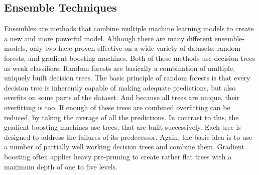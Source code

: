 \subsection{Ensemble Techniques}
Ensembles are methods that combine multiple machine learning models to create a new and more powerful model. Although there are many different ensemble-models, only two have proven effective on a wide variety of datasets: random forests, and gradient boosting machines. Both of these methods use decision trees as weak classifiers. Random forests are basically a combination of multiple, uniquely built decision trees. The basic principle of random forests is that every decision tree is inherently capable of making adequate predictions, but also overfits on some parts of the dataset. And because all trees are unique, their overfitting is too. If enough of these trees are combined overfitting can be reduced, by taking the average of all the predictions. In contrast to this, the gradient boosting machines use trees, that are built successively. Each tree is designed to address the failures of its predecessor. Again, the basic idea is to use a number of partially well working decision trees and combine them. Gradient boosting often applies heavy pre-pruning to create rather flat trees with a maximum depth of one to five levels. 
 
%
